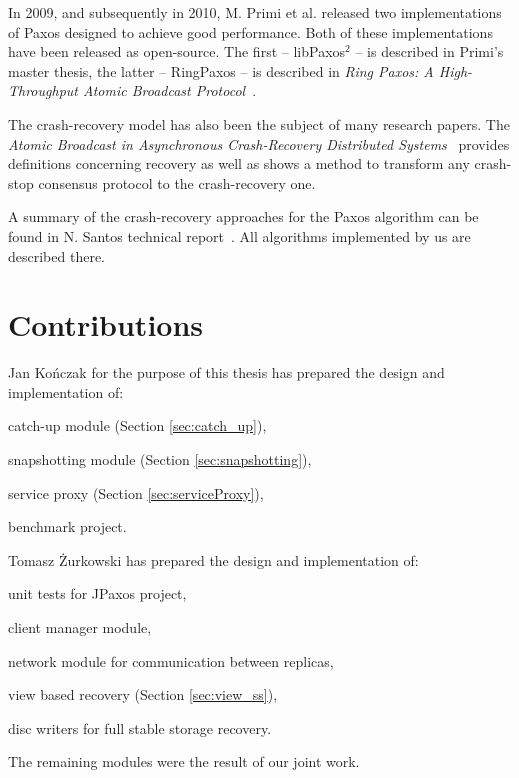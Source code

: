 In 2009, and subsequently in 2010, M. Primi et al. released two implementations of Paxos designed to achieve good performance. Both of these implementations have been released as open-source. The first -- libPaxos$^2$ -- is described in Primi's master thesis, the latter -- RingPaxos -- is described in \textit{Ring Paxos: A High-Throughput Atomic Broadcast Protocol}~\cite{Mar10}.

The crash-recovery model has also been the subject of many research papers. The \textit{Atomic Broadcast in Asynchronous Crash-Recovery Distributed Systems}~\cite{rodriguez2000atomic} provides definitions concerning recovery as well as shows a method to transform any crash-stop consensus protocol to the crash-recovery one.

A summary of the crash-recovery approaches for the Paxos algorithm can be found in N. Santos technical report~\cite{Nun10}. All algorithms implemented by us are described there.

\section{Contributions}

Jan Kończak for the purpose of this thesis has prepared the design and implementation of:
\begin{tightList}
  \item[\textbullet] catch-up module (Section \ref{sec:catch_up}),
  \item[\textbullet] snapshotting module (Section \ref{sec:snapshotting}),
  \item[\textbullet] service proxy  (Section \ref{sec:serviceProxy}),
  \item[\textbullet] benchmark project.
\end{tightList}

\noindent Tomasz Żurkowski has prepared the design and implementation of:
\begin{tightList}
  \item[\textbullet] unit tests for JPaxos project,
  \item[\textbullet] client manager module, 
  \item[\textbullet] network module for communication between replicas,
  \item[\textbullet] view based recovery (Section \ref{sec:view_ss}),
  \item[\textbullet] disc writers for full stable storage recovery.
\end{tightList}

\noindent The remaining modules were the result of our joint work.
